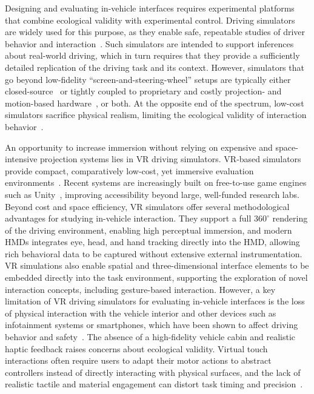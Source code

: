 \documentclass[sigconf, screen]{acmart}
\begin{document}
Designing and evaluating in-vehicle interfaces requires experimental platforms that combine ecological validity with experimental control. Driving simulators~\cite{fisher_handbook_2011} are widely used for this purpose, as they enable safe, repeatable studies of driver behavior and interaction~\cite{caird2011twelve}. 
Such simulators are intended to support inferences about real-world driving, which in turn requires that they provide a sufficiently detailed replication of the driving task and its context.
However, simulators that go beyond low-fidelity “screen-and-steering-wheel” setups are typically either closed-source~\cite{mortimer_hector-vr_2019, krueger_silabtask_2005} or tightly coupled to proprietary and costly projection- and motion-based hardware~\cite{himmels_bigger_2024}, or both. At the opposite end of the spectrum, low-cost simulators sacrifice physical realism, limiting the ecological validity of interaction behavior~\cite{mcmahan_evaluating_2012}.

An opportunity to increase immersion without relying on expensive and space-intensive projection systems lies in \gls{VR} driving simulators. VR-based simulators provide compact, comparatively low-cost, yet immersive evaluation environments~\cite{bayarri_virtual_1996}. Recent systems are increasingly built on free-to-use game engines such as Unity~\cite{bazilinskyy_coupled_2020}, improving accessibility beyond large, well-funded research labs.
%
Beyond cost and space efficiency, VR simulators offer several methodological advantages for studying in-vehicle interaction. They support a full $360^{\circ}$ rendering of the driving environment, enabling high perceptual immersion, and modern \glspl{HMD} integrates eye, head, and hand tracking directly into the \gls{HMD}, allowing rich behavioral data to be captured without extensive external instrumentation. VR simulations also enable spatial and three-dimensional interface elements to be embedded directly into the task environment, supporting the exploration of novel interaction concepts, including gesture-based interaction.
%
However, a key limitation of VR driving simulators for evaluating in-vehicle interfaces is the loss of physical interaction with the vehicle interior and other devices such as infotainment systems or smartphones, which have been shown to affect driving behavior and safety~\cite{ebel_forces_2023, ebel_multitasking_2023}. The absence of a high-fidelity vehicle cabin and realistic haptic feedback raises concerns about ecological validity. Virtual touch interactions often require users to adapt their motor actions to abstract controllers instead of directly interacting with physical surfaces, and the lack of realistic tactile and material engagement can distort task timing and precision~\cite{lavoie_how_2025, personeni_ecological_2023}.
\end{document}
